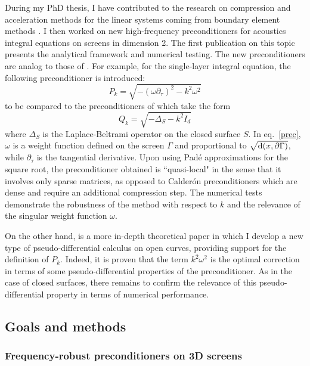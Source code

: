 \documentclass[]{report}
\begin{document}
During my PhD thesis, I have contributed to the research on compression and acceleration methods for the linear systems coming from boundary element methods \cite{averseng2017fast}. I then worked on new high-frequency preconditioners for acoustics integral equations on screens in dimension 2. The first publication on this topic \cite{alouges2019new} presents the analytical framework and numerical testing. The new preconditioners are analog to those of \cite{antoine2007generalized}. For example, for the single-layer integral equation, the following preconditioner is introduced: 
\begin{equation}
\label{prec}
P_k = \sqrt{-(\omega \partial_\tau)^2 - k^2 \omega^2}
\end{equation}
to be compared to the preconditioners of \cite{antoine2007generalized} which take the form
\[Q_k = \sqrt{-\Delta_S - k^2 I_d}\]
where $\Delta_S$ is the Laplace-Beltrami operator on the closed surface $S$. 
In eq.~\eqref{prec}, $\omega$ is a weight function defined on the screen $\Gamma$ and proportional to $\sqrt{\textup{d}(x,\partial \Gamma)}$, while $\partial_\tau$ is the tangential derivative.
Upon using Padé approximations for the square root, the preconditioner obtained is ``quasi-local" in the sense that it involves only sparse matrices, as opposed to Calder\'{o}n preconditioners which are dense and require an additional compression step. The numerical tests demonstrate the robustness of the method with respect to $k$ and the relevance of the singular weight function $\omega$. 

On the other hand, \cite{averseng2019pseudo} is a more in-depth theoretical paper in which I develop a new type of pseudo-differential calculus on open curves, providing support for the definition of $P_k$. Indeed, it is proven that the term $k^2 \omega^2$ is the optimal correction in terms of some pseudo-differential properties of the preconditioner. As in the case of closed surfaces, there remains to confirm the relevance of this pseudo-differential property in terms of numerical performance.  



\subsection*{Goals and methods}


\subsubsection*{Frequency-robust preconditioners on 3D screens}
\end{document}
